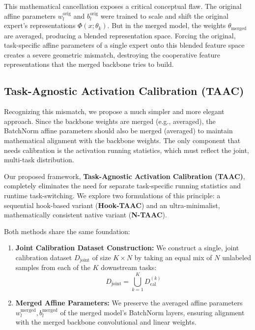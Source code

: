 \documentclass{article}
\theoremstyle{plain}
\theoremstyle{definition}
\theoremstyle{remark}
\begin{document}
This mathematical cancellation exposes a critical conceptual flaw. The original affine parameters $w_l^{\text{orig}}$ and $b_l^{\text{orig}}$ were trained to scale and shift the original expert's representations $\Phi(x; \theta_k)$. But in the merged model, the weights $\theta_{\text{merged}}$ are averaged, producing a blended representation space. Forcing the original, task-specific affine parameters of a single expert onto this blended feature space creates a severe geometric mismatch, destroying the cooperative feature representations that the merged backbone tries to build.

\subsection{Task-Agnostic Activation Calibration (TAAC)}
Recognizing this mismatch, we propose a much simpler and more elegant approach. Since the backbone weights are merged (e.g., averaged), the BatchNorm affine parameters should also be merged (averaged) to maintain mathematical alignment with the backbone weights. The only component that needs calibration is the activation running statistics, which must reflect the joint, multi-task distribution.

Our proposed framework, \textbf{Task-Agnostic Activation Calibration (TAAC)}, completely eliminates the need for separate task-specific running statistics and runtime task-switching. We explore two formulations of this principle: a sequential hook-based variant (\textbf{Hook-TAAC}) and an ultra-minimalist, mathematically consistent native variant (\textbf{N-TAAC}).

Both methods share the same foundation:
\begin{enumerate}
\item \textbf{Joint Calibration Dataset Construction:}
We construct a single, joint calibration dataset $D_{\text{joint}}$ of size $K \times N$ by taking an equal mix of $N$ unlabeled samples from each of the $K$ downstream tasks:
\begin{equation}
D_{\text{joint}} = \bigcup_{k=1}^K D_{\text{cal}}^{(k)}
\end{equation}
\item \textbf{Merged Affine Parameters:}
We preserve the averaged affine parameters $w_l^{\text{merged}}, b_l^{\text{merged}}$ of the merged model's BatchNorm layers, ensuring alignment with the merged backbone convolutional and linear weights.
\end{enumerate}
\end{document}
